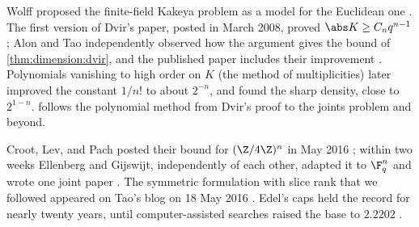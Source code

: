 \begin{refsection}
Wolff proposed the finite-field Kakeya problem as a model for the Euclidean one \parencite{Wolff1999}. The first version of Dvir's paper, posted in March 2008, proved $\abs K\ge C_nq^{n-1}$; Alon and Tao independently observed how the argument gives the bound of \cref{thm:dimension:dvir}, and the published paper includes their improvement \parencite{Dvir2009}. Polynomials vanishing to high order on $K$ (the method of multiplicities) later improved the constant $1/n!$ to about $2^{-n}$, and \textcite{BukhChao2021} found the sharp density, close to $2^{1-n}$. \textcite{Guth2016} follows the polynomial method from Dvir's proof to the joints problem and beyond.

Croot, Lev, and Pach posted their bound for $(\Z/4\Z)^n$ in May 2016 \parencite{CrootLevPach2017}; within two weeks Ellenberg and Gijswijt, independently of each other, adapted it to $\F_q^n$ and wrote one joint paper \parencite{EllenbergGijswijt2017}. The symmetric formulation with slice rank that we followed appeared on Tao's blog on 18 May 2016 \parencite{Tao2016}. Edel's caps \parencite{Edel2004} held the record for nearly twenty years, until computer-assisted searches raised the base to $2.2202$ \parencite{RomeraParedesEtAl2024}.

\printchapterbib
\end{refsection}
